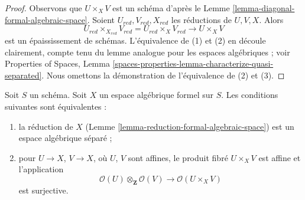 \begin{proof}
Observons que $U \times_X V$ est un schéma d'après le
Lemme \ref{lemma-diagonal-formal-algebraic-space}.
Soient $U_{red}, V_{red}, X_{red}$ les réductions de $U, V, X$.
Alors
$$
U_{red} \times_{X_{red}} V_{red} = U_{red} \times_X V_{red} \to U \times_X V
$$
est un épaississement de schémas. L'équivalence de (1) et (2) en découle
clairement, compte tenu du lemme analogue pour les espaces algébriques ; voir
Properties of Spaces, Lemma
\ref{spaces-properties-lemma-characterize-quasi-separated}.
Nous omettons la démonstration de l'équivalence de (2) et (3).
\end{proof}

\begin{lemma}
\label{lemma-characterize-separated}
Soit $S$ un schéma. Soit $X$ un espace algébrique formel sur $S$.
Les conditions suivantes sont équivalentes :
\begin{enumerate}
\item la réduction de $X$
(Lemme \ref{lemma-reduction-formal-algebraic-space}) est un espace
algébrique séparé ;
\item pour $U \to X$, $V \to X$, où $U$, $V$ sont affines,
le produit fibré $U \times_X V$ est affine et l'application
$$
\mathcal{O}(U) \otimes_\mathbf{Z} \mathcal{O}(V)
\longrightarrow
\mathcal{O}(U \times_X V)
$$
est surjective.
\end{enumerate}
\end{lemma}


